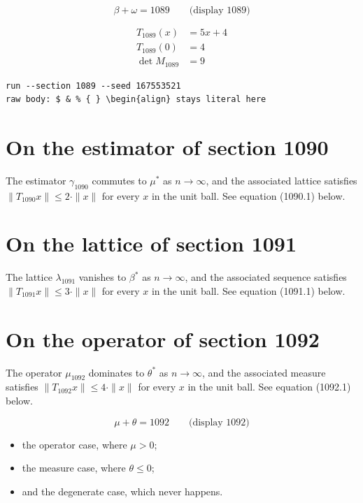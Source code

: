 \documentclass{article}
\begin{document}
$$
\beta + \omega = 1089 \qquad \text{(display 1089)}
$$

\begin{align}
T_{1089}(x) &= 5 x + 4 \\
T_{1089}(0) &= 4 \\
\det M_{1089} &= 9
\end{align}

\begin{verbatim}
run --section 1089 --seed 167553521
raw body: $ & % { } \begin{align} stays literal here
\end{verbatim}

\section{On the estimator of section 1090}
The estimator $\gamma_{1090}$ commutes to $\mu^{*}$ as $n \to \infty$,
and the associated lattice satisfies $\|T_{1090} x\| \leq 2 \cdot \|x\|$
for every $x$ in the unit ball. See equation (1090.1) below.

\section{On the lattice of section 1091}
The lattice $\lambda_{1091}$ vanishes to $\beta^{*}$ as $n \to \infty$,
and the associated sequence satisfies $\|T_{1091} x\| \leq 3 \cdot \|x\|$
for every $x$ in the unit ball. See equation (1091.1) below.

\section{On the operator of section 1092}
The operator $\mu_{1092}$ dominates to $\theta^{*}$ as $n \to \infty$,
and the associated measure satisfies $\|T_{1092} x\| \leq 4 \cdot \|x\|$
for every $x$ in the unit ball. See equation (1092.1) below.

$$
\mu + \theta = 1092 \qquad \text{(display 1092)}
$$

\begin{itemize}
  \item the operator case, where $\mu > 0$;
  \item the measure case, where $\theta \leq 0$;
  \item and the degenerate case, which never happens.
\end{itemize}
\end{document}
